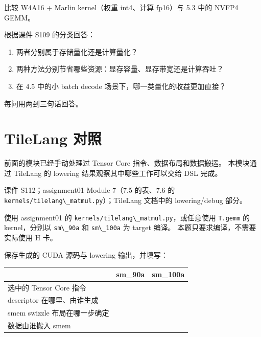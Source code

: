 \documentclass[11pt,a4paper,fontset=none]{ctexart}
\providecommand{\passthrough}[1]{#1}
\begin{document}

比较 W4A16 + Marlin kernel（权重 int4、计算 fp16）与 5.3 中的 NVFP4
GEMM。

根据课件 S109 的分类回答：

\begin{enumerate}
\def\labelenumi{(\alph{enumi})}
\item
  两者分别属于存储量化还是计算量化？
\item
  两种方法分别节省哪些资源：显存容量、显存带宽还是计算吞吐？
\item
  在 4.5 中的小 batch decode 场景下，哪一类量化的收益更加直接？
\end{enumerate}

每问用两到三句话回答。

\section{TileLang 对照}\label{tilelang-ux5bf9ux7167}

前面的模块已经手动处理过 Tensor Core 指令、数据布局和数据搬运。
本模块通过 TileLang 的 lowering 结果观察其中哪些工作可以交给 DSL 完成。

\begin{reading}

课件 S112；assignment01 Module 7（7.5 的表、7.6 的
\passthrough{\lstinline!kernels/tilelang\_matmul.py!}）；TileLang
文档中的 lowering/debug 部分。

\end{reading}


使用 assignment01 的
\passthrough{\lstinline!kernels/tilelang\_matmul.py!}，或任意使用
\passthrough{\lstinline!T.gemm!} 的 kernel，分别以
\passthrough{\lstinline!sm\_90a!} 和 \passthrough{\lstinline!sm\_100a!}
为 target 编译。 本题只要求编译，不需要实际使用 H 卡。

保存生成的 CUDA 源码与 lowering 输出，并填写：

{\def\LTcaptype{none} %
\begin{longtable}[]{@{}lll@{}}
\toprule\noalign{}
& sm\_90a & sm\_100a \\
\midrule\noalign{}
\endhead
\bottomrule\noalign{}
\endlastfoot
选中的 Tensor Core 指令 & & \\
descriptor 在哪里、由谁生成 & & \\
smem swizzle 布局在哪一步确定 & & \\
数据由谁搬入 smem & & \\
\end{longtable}
}
\end{document}
